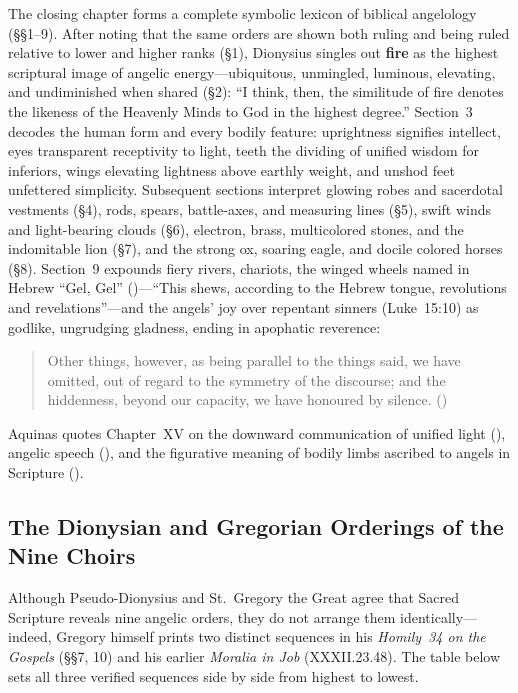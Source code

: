 The closing chapter forms a complete symbolic lexicon of biblical angelology (\S\S 1--9). After noting that the same orders are shown both ruling and being ruled relative to lower and higher ranks (\S 1), Dionysius singles out \textbf{fire} as the highest scriptural image of angelic energy---ubiquitous, unmingled, luminous, elevating, and undiminished when shared (\S 2): ``I think, then, the similitude of fire denotes the likeness of the Heavenly Minds to God in the highest degree.'' Section~3 decodes the human form and every bodily feature: uprightness signifies intellect, eyes transparent receptivity to light, teeth the dividing of unified wisdom for inferiors, wings elevating lightness above earthly weight, and unshod feet unfettered simplicity. Subsequent sections interpret glowing robes and sacerdotal vestments (\S 4), rods, spears, battle-axes, and measuring lines (\S 5), swift winds and light-bearing clouds (\S 6), electron, brass, multicolored stones, and the indomitable lion (\S 7), and the strong ox, soaring eagle, and docile colored horses (\S 8). Section~9 expounds fiery rivers, chariots, the winged wheels named in Hebrew ``Gel, Gel'' ()---``This shews, according to the Hebrew tongue, revolutions and revelations''---and the angels' joy over repentant sinners (Luke~15:10) as godlike, ungrudging gladness, ending in apophatic reverence:
\begin{quotation}
Other things, however, as being parallel to the things said, we have omitted, out of regard to the symmetry of the discourse; and the hiddenness, beyond our capacity, we have honoured by silence. ()
\end{quotation}
Aquinas quotes Chapter~XV on the downward communication of unified light (), angelic speech (), and the figurative meaning of bodily limbs ascribed to angels in Scripture ().

\subsection{The Dionysian and Gregorian Orderings of the Nine Choirs}
\label{subsec:dionysius-gregory-orderings}

Although Pseudo-Dionysius and St.~Gregory the Great agree that Sacred Scripture reveals nine angelic orders, they do not arrange them identically---indeed, Gregory himself prints two distinct sequences in his \emph{Homily~34 on the Gospels} (\S\S 7, 10) and his earlier \emph{Moralia in Job} (XXXII.23.48). The table below sets all three verified sequences side by side from highest to lowest.

